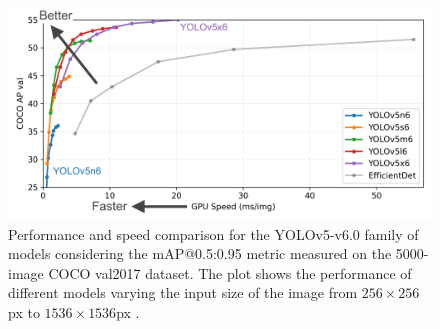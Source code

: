 \begin{figure}
	\centering

    \begin{center}
        \includegraphics[width=\columnwidth]{images/yolov5-sizes.png}
    \end{center}

	\caption{Performance and speed comparison for the YOLOv5-v6.0 family of models considering the mAP@0.5:0.95 metric measured on the 5000-image COCO val2017 \cite{lin2014microsoft} dataset. The plot shows the performance of different models varying the input size of the image from $256 \times 256$px to $1536 \times 1536$px \cite{glenn_jocher_2021_5563715}.}
	\label{fig:yolo-sizes}%
\end{figure}


